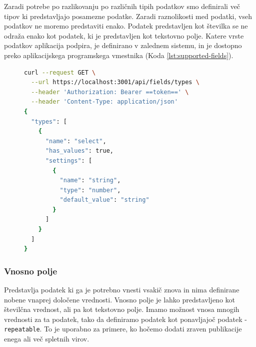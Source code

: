\documentclass[a4paper, 12pt]{book}
\begin{document}
Zaradi potrebe po razlikovanju po različnih tipih podatkov smo definirali več tipov ki predstavljajo posamezne podatke. Zaradi raznolikosti med podatki, vseh podatkov ne moremo predstaviti enako. Podatek predstavljen kot številka se ne odraža enako kot podatek, ki je predstavljen kot tekstovno polje. Katere vrste podatkov aplikacija podpira, je definirano v zalednem sistemu, in je dostopno preko aplikacijskega programskega vmestnika (Koda \ref{lst:supported-fields}). 

\begin{figure}[h]
    \centering
    \begin{lstlisting}[language=bash, style=mystyle,caption={Izsek aplikacijskega vmestinka za pridobitev vseh podprtih tipov v aplikaciji},label=lst:supported-fields]
curl --request GET \
  --url https://localhost:3001/api/fields/types \
  --header 'Authorization: Bearer ==token==' \
  --header 'Content-Type: application/json'
{
  "types": [
    {
      "name": "select",
      "has_values": true,
      "settings": [
        {
          "name": "string",
          "type": "number",
          "default_value": "string"
        }
      ]
    }
  ]
}
\end{lstlisting}
\end{figure}




\subsubsection{Vnosno polje}
Predstavlja podatek ki ga je potrebno vnesti vsakič znova in nima definirane nobene vnaprej določene vrednosti. Vnosno polje je lahko predstavljeno kot številčna vrednost, ali pa kot tekstovno polje. 
Imamo možnost vnosa mnogih vrednosti za ta podatek, tako da definiramo podatek kot ponavljajoč podatek - \verb=repeatable=. To je uporabno za primere, ko hočemo dodati zraven publikacije enega ali več spletnih virov.
\end{document}
